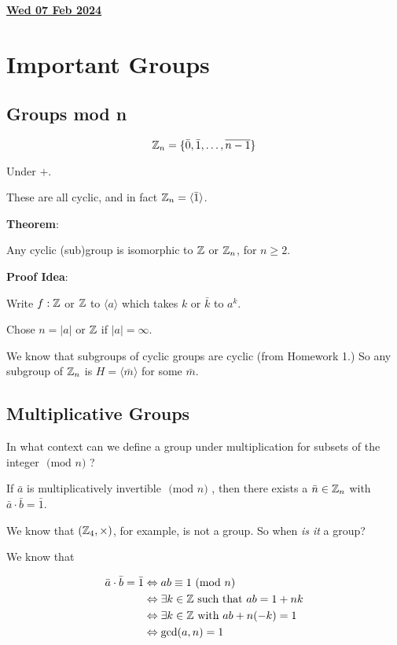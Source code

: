 \documentclass[12pt]{article}
\renewcommand{\date}[1]{\underline{\bf #1}}
\newcommand{\lr}[1]{\langle #1 \rangle}
\renewcommand{\mod}[1]{
  \text{ (mod $#1$) }
}
\begin{document}
\date{Wed 07 Feb 2024}

\section{Important Groups}

\subsection{Groups mod n}

\[
	{\mathbb Z}_n = \{\bar 0, \bar 1, \dots, \overline{n - 1}\}
\]

Under $+$.

These are all cyclic, and in fact $\Z_n = \lr {\bar 1}$.

	{\bf Theorem}:

Any cyclic (sub)group is isomorphic to ${\mathbb Z}$ or ${\mathbb Z}_n$, for $n \ge 2$.

	{\bf Proof Idea}:

Write $f: {\mathbb Z}$ or ${\mathbb Z}$ to $\lr {a}$ which takes $k$ or $\bar k$ to $a^k$.

Chose $n = |a|$ or ${\mathbb Z}$ if $|a| = \infty$.

We know that subgroups of cyclic groups are cyclic (from Homework 1.) So any
subgroup of ${\mathbb Z}_n$ is $H = \lr{\bar m}$ for some $\bar m$.


\subsection{Multiplicative Groups}

In what context can we define a group under
multiplication for subsets of the integer $\mod n$?

If $\bar a$ is multiplicatively invertible $\mod n$, then there exists a
$\bar n \in {\mathbb Z}_n$ with $\bar a \cdot \bar b = \bar 1$.

We know that $({\mathbb Z}_4, \times)$, for example, is not a group. So when {\it is
		it} a group?

We know that

\begin{align*}
	\bar a \cdot \bar b = \bar 1 & \Leftrightarrow ab \equiv 1 \mod n           \\
	                             & \Leftrightarrow \exists k \in \Z \text{ such
	that } ab = 1 + nk                                                          \\
	                             & \Leftrightarrow \exists k \in \Z \text{
	with } ab + n(-k) = 1                                                       \\
	                             & \Leftrightarrow \gcd(a, n) = 1
\end{align*}
\end{document}

